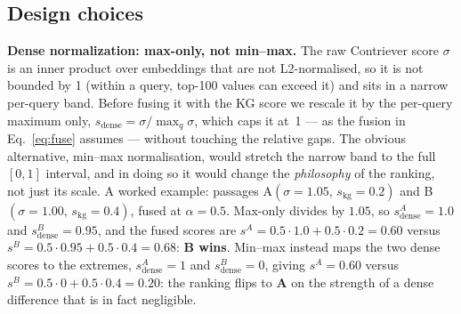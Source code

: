 \documentclass{article}
\begin{document}
\subsection*{Design choices}
\textbf{Dense normalization: max-only, not min--max.} The raw Contriever score $\sigma$ is an inner product over embeddings that are not L2-normalised, so it is not bounded by 1 (within a query, top-100 values can exceed it) and sits in a narrow per-query band. Before fusing it with the KG score we rescale it by the per-query maximum only, $s_{\mathrm{dense}}=\sigma/\max_q\sigma$, which caps it at~1 --- as the fusion in Eq.~\eqref{eq:fuse} assumes --- without touching the relative gaps. The obvious alternative, min--max normalisation, would stretch the narrow band to the full $[0,1]$ interval, and in doing so it would change the \emph{philosophy} of the ranking, not just its scale. A worked example: passages A$(\sigma{=}1.05,\,s_{\mathrm{kg}}{=}0.2)$ and B$(\sigma{=}1.00,\,s_{\mathrm{kg}}{=}0.4)$, fused at $\alpha{=}0.5$. Max-only divides by $1.05$, so $s_{\mathrm{dense}}^A=1.0$ and $s_{\mathrm{dense}}^B=0.95$, and the fused scores are $s^A=0.5\cdot1.0+0.5\cdot0.2=0.60$ versus $s^B=0.5\cdot0.95+0.5\cdot0.4=0.68$: \textbf{B wins}. Min--max instead maps the two dense scores to the extremes, $s_{\mathrm{dense}}^A=1$ and $s_{\mathrm{dense}}^B=0$, giving $s^A=0.60$ versus $s^B=0.5\cdot0+0.5\cdot0.4=0.20$: the ranking flips to \textbf{A} on the strength of a dense difference that is in fact negligible.
\end{document}
